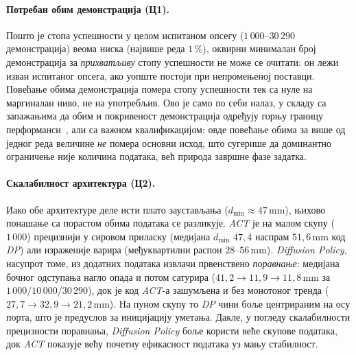 \documentclass[12pt, a4paper]{article}
\begin{document}
\paragraph{Потребан обим демонстрација (Ц1).}
Пошто је стопа успешности у целом испитаном опсегу ($1\,000$–$30\,290$ демонстрација) веома ниска (највише реда $1\,\%$), оквирни минималан број демонстрација за \emph{прихватљиву} стопу успешности не може се очитати: он лежи изван испитаног опсега, ако уопште постоји при непромењеној поставци. Повећање обима демонстрација помера стопу успешности тек са нуле на маргиналан ниво, не на употребљив.
Ово је само по себи налаз, у складу са запажањима да обим и покривеност демонстрација одређују горњу границу перформанси~\cite{mandlekar2021robomimic, belkhale2023dataquality}, али са важном квалификацијом: овде повећање обима за више од једног реда величине \emph{не} помера основни исход, што сугерише да доминантно ограничење није количина података, већ природа завршне фазе задатка.

\paragraph{Скалабилност архитектура (Ц2).}
Иако обе архитектуре деле исти плато заустављања ($d_{\min}\approx 47$\,mm), њихово понашање са порастом обима података се разликује.
\textit{ACT} је на малом скупу ($1\,000$) прецизнији у сировом приласку (медијана $d_{\min}$ $47{,}4$ наспрам $51{,}6$\,mm код \textit{DP}) али израженије варира (међуквартилни распон $28\text{–}56$\,mm).
\textit{Diffusion Policy}, насупрот томе, из додатних података извлачи првенствено \emph{поравнање}: медијана бочног одступања нагло опада и потом сатурира ($41{,}2 \to 11{,}9 \to 11{,}8$\,mm за $1\,000/10\,000/30\,290$), док је код \textit{ACT}-а зашумљена и без монотоног тренда ($27{,}7 \to 32{,}9 \to 21{,}2$\,mm).
На пуном скупу то \textit{DP} чини боље центрираним на осу порта, што је предуслов за иницијацију уметања.
Дакле, у погледу скалабилности прецизности поравнања, \textit{Diffusion Policy} боље користи веће скупове података, док \textit{ACT} показује већу почетну ефикасност података уз мању стабилност.
\end{document}
